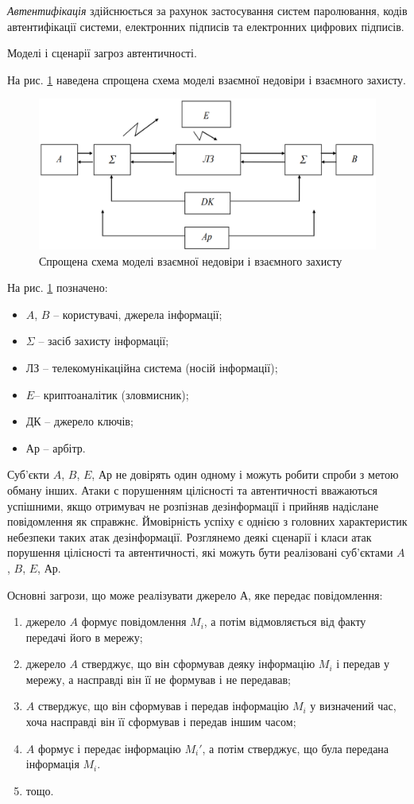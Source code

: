 \textit{Автентифікація} здійснюється за рахунок застосування систем
паролювання, кодів автентифікації системи, електронних підписів та
електронних цифрових підписів.

Моделі і сценарії загроз автентичності.

На рис. \ref{fig:enter_label1} наведена спрощена схема моделі взаємної недовіри і
взаємного захисту.

\begin{figure}
    \centering
    \includegraphics[width=0.5\linewidth]{Images/image1.png}
    \caption{Спрощена схема моделі взаємної недовіри і взаємного захисту}
    \label{fig:enter_label1}
\end{figure}

На рис. \ref{fig:enter_label1} позначено:
\begin{itemize}
    \item $A$, $B$ – користувачі, джерела інформації;
    \item $\Sigma$ – засіб захисту інформації;
    \item ЛЗ – телекомунікаційна система (носій інформації);
    \item $E$– криптоаналітик (зловмисник);
    \item ДК – джерело ключів;
    \item Ар – арбітр.
\end{itemize}

Суб'єкти $A$, $B$, $E$, Ар не довірять один одному і можуть робити спроби з
метою обману інших. Атаки с порушенням цілісності та автентичності
вважаються успішними, якщо отримувач не розпізнав дезінформації і прийняв
надіслане повідомлення як справжнє. Ймовірність успіху є однією з головних
характеристик небезпеки таких атак дезінформації. Розглянемо деякі сценарії і
класи атак порушення цілісності та автентичності, які можуть бути реалізовані
суб'єктами $A$, $B$, $E$, Ар.

Основні загрози, що може реалізувати джерело А, яке передає повідомлення:
\begin{enumerate}
    \item джерело $A$ формує повідомлення $M_i$, а потім відмовляється від факту передачі його в мережу;
    \item джерело $A$ стверджує, що він сформував деяку інформацію $M_i$ і передав у мережу,
        а насправді він її не формував і не передавав;
    \item $A$ стверджує, що він сформував і передав інформацію $M_i$ у визначений
        час, хоча насправді він її сформував і передав іншим часом;
    \item $A$ формує і передає інформацію $M_i'$, а потім стверджує, що була
        передана інформація $M_i$.
    \item тощо.
\end{enumerate}

